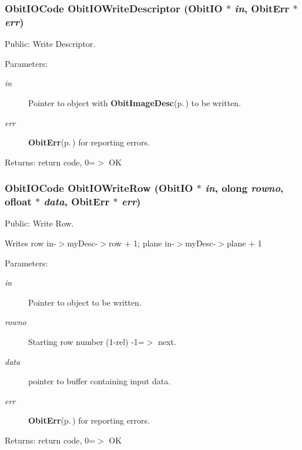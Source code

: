 \subsubsection{\setlength{\rightskip}{0pt plus 5cm}Obit\-IOCode Obit\-IOWrite\-Descriptor ({\bf Obit\-IO} $\ast$ {\em in}, {\bf Obit\-Err} $\ast$ {\em err})}\label{ObitIO_8h_a50}


Public: Write Descriptor. 

\begin{Desc}
\item[Parameters:]
\begin{description}
\item[{\em in}]Pointer to object with {\bf Obit\-Image\-Desc}{\rm (p.\,\pageref{structObitImageDesc})} to be written. \item[{\em err}]{\bf Obit\-Err}{\rm (p.\,\pageref{structObitErr})} for reporting errors. \end{description}
\end{Desc}
\begin{Desc}
\item[Returns:]return code, 0=$>$ OK \end{Desc}
\subsubsection{\setlength{\rightskip}{0pt plus 5cm}Obit\-IOCode Obit\-IOWrite\-Row ({\bf Obit\-IO} $\ast$ {\em in}, {\bf olong} {\em rowno}, {\bf ofloat} $\ast$ {\em data}, {\bf Obit\-Err} $\ast$ {\em err})}\label{ObitIO_8h_a47}


Public: Write Row. 

Writes row in-$>$my\-Desc-$>$row + 1; plane in-$>$my\-Desc-$>$plane + 1 \begin{Desc}
\item[Parameters:]
\begin{description}
\item[{\em in}]Pointer to object to be written. \item[{\em rowno}]Starting row number (1-rel) -1=$>$ next. \item[{\em data}]pointer to buffer containing input data. \item[{\em err}]{\bf Obit\-Err}{\rm (p.\,\pageref{structObitErr})} for reporting errors. \end{description}
\end{Desc}
\begin{Desc}
\item[Returns:]return code, 0=$>$ OK \end{Desc}
